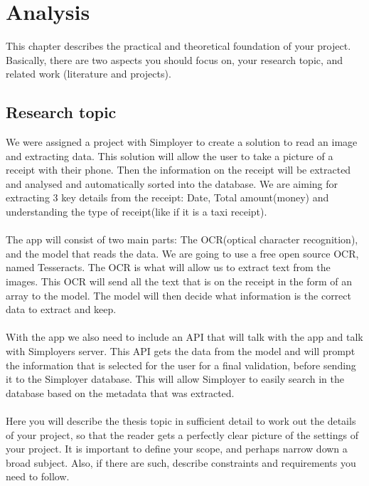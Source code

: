 \cleardoublepage
\chapter{Analysis}
\label{ch:analysis}

This chapter describes the practical and theoretical foundation of your project.
Basically, there are two aspects you should focus on, your research topic, and related work (literature and projects).

\section{Research topic}\label{sec:research-topic}

We were assigned a project with Simployer to create a solution to read an image and extracting data.
This solution will allow the user to take a picture of a receipt with their phone.
Then the information on the receipt will be extracted and analysed and automatically sorted into the database.
We are aiming for extracting 3 key details from the receipt: Date, Total amount(money) and understanding the type of receipt(like if it is a taxi receipt).\\
\\
The app will consist of two main parts: The OCR(optical character recognition), and the model that reads the data.
We are going to use a free open source OCR, named Tesseracts.
The OCR is what will allow us to extract text from the images.
This OCR will send all the text that is on the receipt in the form of an array to the model.
The model will then decide what information is the correct data to extract and keep.\\
\\
With the app we also need to include an API that will talk with the app and talk with Simployers server.
This API gets the data from the model and will prompt the information that is selected for the user for a final
validation, before sending it to the Simployer database.
This will allow Simployer to easily search in the database based on the metadata that was extracted.\\
\\
Here you will describe the thesis topic in sufficient detail to work out the details of your project, so that the reader gets a perfectly clear picture of the settings of your project.
It is important to define your scope, and perhaps narrow down a broad subject.
Also, if there are such, describe constraints and requirements you need to follow.

